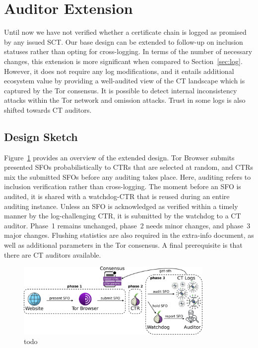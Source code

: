 \section{Auditor Extension} \label{sec:auditor}
Until now we have not verified whether a certificate chain is logged as promised
by any issued SCT.  Our base design can be extended to follow-up on inclusion
statuses rather than opting for cross-logging.  In terms of
the number of necessary changes, this extension is more significant when
compared to Section~\ref{sec:log}.  However, it does not require any log
modifications, and it entails additional ecosystem value by providing a
well-audited view of the CT landscape which is captured by the Tor consensus.
It is possible to detect internal inconsistency attacks within the Tor
network and omission attacks.  Trust in some logs is also shifted towards CT
auditors.

\subsection{Design Sketch}
Figure~\ref{fig:auditor} provides an overview of the extended design.  Tor
Browser submits presented SFOs probabilistically to CTRs that are selected at
random, and CTRs mix the submitted SFOs before any auditing takes place.  Here,
auditing refers to inclusion verification rather than cross-logging.  The moment
before an SFO is audited, it is shared with a watchdog-CTR that is reused during
an entire auditing instance.  Unless an SFO is acknowledged as verified within a
timely manner by the log-challenging CTR, it is submitted by the watchdog to a
CT auditor.  Phase~1 remains unchanged, phase~2 needs minor changes, and phase~3
major changes.  Flushing statistics are also required in the extra-info
document, as well as additional parameters in the Tor consensus.  A final
prerequisite is that there are CT auditors available.

\begin{figure}
    \centering
    \includegraphics[width=0.85\textwidth]{img/design-auditor}
    \caption{todo}
	\label{fig:auditor}
\end{figure}

